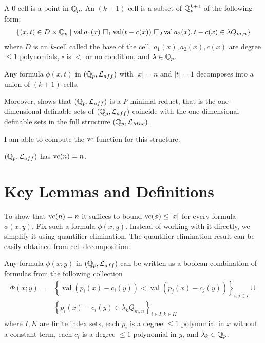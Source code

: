 \documentclass{amsart}
\renewcommand{\LL}{\mathcal L}
\newcommand{\LLM}{\mathcal L_{Mac}}
\newcommand{\curly}[1]{\left\{#1\right\}}
\DeclareMathOperator{\vval}{val}
\newcommand{\defn}{\underline}
\begin{document}
\begin{Definition} \label{cell}
  A $0$-cell is a point in $\mathbb{Q}_p$.
  An $(k+1)$-cell is a subset of $\mathbb{Q}_p^{k+1}$ of the following form:
  \begin{align*}
    \curly{(x, t) \in D \times \Q_p \mid \vval a_1(x) \ \square_1 \vval (t - c(x)) \ \square_2 \vval a_2(x), t - c(x) \in \lambda Q_{m,n} }
  \end{align*}
  where $D$ is an $k$-cell called the \defn{base} of the cell,
  $a_1(x), a_2(x), c(x)$ are degree $\leq 1$ polynomials,
  $\square$ is $<$ or no condition, and
  $\lambda  \in\mathbb{Q}_p$.
\end{Definition}

\begin{Theorem}[Leenknegt '12] 
  Any formula $\phi(x, t)$ in $(\Q_p, \LL_{aff})$ with $|x| = n$ and $|t| = 1$ decomposes into a union of $(k+1)$-cells.
\end{Theorem}  

Moreover, \cite{reduct} shows that $(\Q_p, \LL_{aff})$ is a $P$-minimal reduct,
that is the one-dimensional definable sets of $(\Q_p, \LL_{aff})$ coincide with the one-dimensional definable sets in the full structure $(\Q_p, \LLM)$.

I am able to compute the $\operatorname{vc}$-function for this structure:
\begin{Theorem} \label{main_theorem}
  $(\Q_p, \LL_{aff})$ has $\operatorname{vc}(n) = n$.
\end{Theorem}


\section{Key Lemmas and Definitions}




To show that $\operatorname{vc}(n) = n$ it suffices to bound $\operatorname{vc}(\phi) \leq |x|$ for every formula $\phi(x; y)$.
Fix such a formula $\phi(x; y)$.
Instead of working with it directly, we simplify it using quantifier elimination.
The quantifier elimination result can be easily obtained from cell decomposition:
\begin{Lemma} \label{quantifier_elimination}
  Any formula $\phi(x; y)$ in $(\Q_p, \LL_{aff})$ can be written as a boolean combination of formulas from the following collection
  \begin{align*}
    \Phi(x; y) = &\curly{\vval (p_i(x) - c_i(y)) < \vval (p_j(x) - c_j(y))}_{i, j \in I} \cup \\
                 &\curly{p_i(x) - c_i(y) \in \lambda_k Q_{m,n}}_{i \in I , k \in K}
  \end{align*}
  where $I, K$ are finite index sets,
  each $p_i$ is a degree $\leq 1$ polynomial in $x$ without a constant term,
  each $c_i$ is a degree $\leq 1$ polynomial in $y$, and
  $\lambda_k \in \mathbb{Q}_p$.
\end{Lemma}
\end{document}
